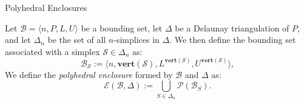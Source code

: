 \begin{frame}[fragile]{Polyhedral Enclosures}
    \begin{definition}
        Let $ \mathcal{B} = \langle n,P, L, U \rangle $ be a bounding set, let $\Delta$ be a Delaunay triangulation of $P$, and let $\Delta_n$ be the set of all $n$-simplices in $\Delta$. We then define the bounding set associated with a simplex $\mathcal{S} \in \Delta_n$ as:
        \[
        \mathcal{B}_{\mathcal{S}} := \langle n,\mathbf{vert}(\mathcal{S}), L^{\mathbf{vert}(\mathcal{S})}, U^{\mathbf{vert}(\mathcal{S})} \rangle,
        \]
        \vspace{0.5em} 
        \noindent
        We define the \emph{polyhedral enclosure} formed by $\mathcal{B}$ and $\Delta$ as:
        \[
        \mathcal{E}(\mathcal{B},\Delta) := \bigcup_{S\in\Delta_n} \mathcal{P}(\mathcal{B}_S).
        \]
        \end{definition}
        
\end{frame}

